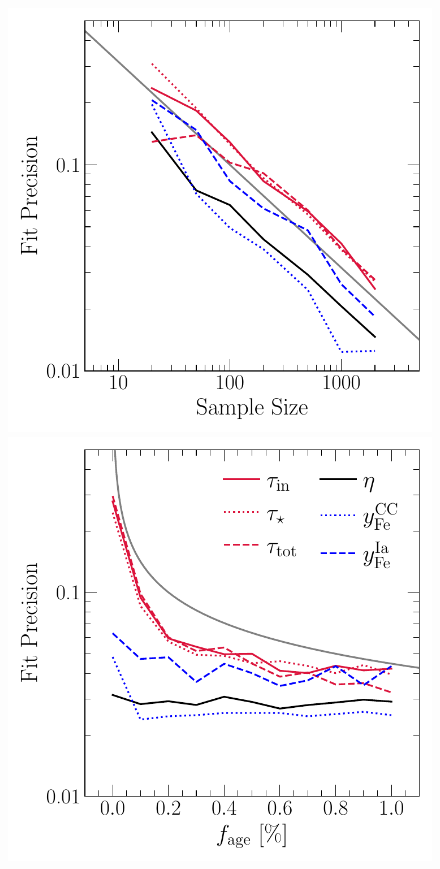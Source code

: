 \documentclass[foo.tex]{subfiles}
\begin{document}
\begin{figure}
\centering
\includegraphics[scale = 0.55]{precision_samplesize.pdf}
\includegraphics[scale = 0.55]{precision_agefrac.pdf}

\end{figure}
\end{document}
